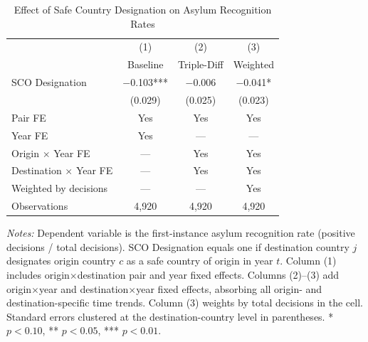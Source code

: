 \begin{table}[H]
\centering
\caption{Effect of Safe Country Designation on Asylum Recognition Rates}
\begin{threeparttable}
\begin{tabular}{lccc}
\toprule
 & (1) & (2) & (3) \\
 & Baseline & Triple-Diff & Weighted \\
\midrule
SCO Designation & $-$0.103*** & $-$0.006 & $-$0.041* \\
 & (0.029) & (0.025) & (0.023) \\[0.5em]
\midrule
Pair FE & Yes & Yes & Yes \\
Year FE & Yes & --- & --- \\
Origin $\times$ Year FE & --- & Yes & Yes \\
Destination $\times$ Year FE & --- & Yes & Yes \\
Weighted by decisions & --- & --- & Yes \\[0.3em]
Observations & 4,920 & 4,920 & 4,920 \\
\bottomrule
\end{tabular}
\begin{tablenotes}[flushleft]
\small
\item \textit{Notes:} Dependent variable is the first-instance asylum recognition rate (positive decisions / total decisions). SCO Designation equals one if destination country $j$ designates origin country $c$ as a safe country of origin in year $t$. Column (1) includes origin$\times$destination pair and year fixed effects. Columns (2)--(3) add origin$\times$year and destination$\times$year fixed effects, absorbing all origin- and destination-specific time trends. Column (3) weights by total decisions in the cell. Standard errors clustered at the destination-country level in parentheses. * $p<0.10$, ** $p<0.05$, *** $p<0.01$.
\end{tablenotes}
\end{threeparttable}
\label{tab:main}
\end{table}
